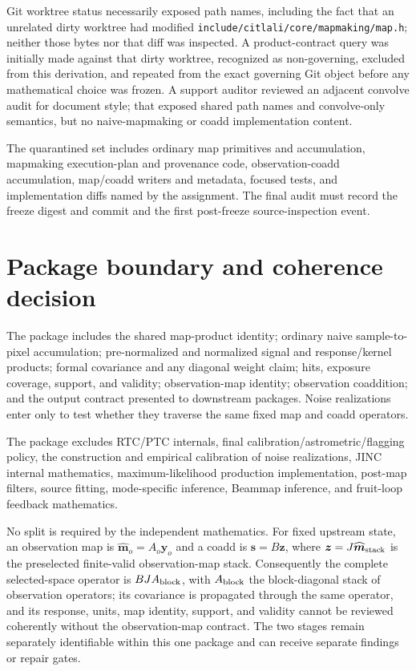 \documentclass[11pt]{article}
\newcommand{\code}[1]{\nolinkurl{#1}}
\begin{document}
Git worktree status necessarily exposed path names, including the fact that an
unrelated dirty worktree had modified
\code{include/citlali/core/mapmaking/map.h}; neither those bytes nor that diff
was inspected. A product-contract query was initially made against that dirty
worktree, recognized as non-governing, excluded from this derivation, and
repeated from the exact governing Git object before any mathematical choice was
frozen. A support auditor reviewed an adjacent convolve audit for document
style; that exposed shared path names and convolve-only semantics, but no
naive-mapmaking or coadd implementation content.

The quarantined set includes ordinary map primitives and accumulation,
mapmaking execution-plan and provenance code, observation-coadd accumulation,
map/coadd writers and metadata, focused tests, and implementation diffs named
by the assignment. The final audit must record the freeze digest and commit
and the first post-freeze source-inspection event.

\section{Package boundary and coherence decision}

The package includes the shared map-product identity; ordinary naive
sample-to-pixel accumulation; pre-normalized and normalized signal and
response/kernel products; formal covariance and any diagonal weight claim;
hits, exposure coverage, support, and validity; observation-map identity;
observation coaddition; and the output contract presented to downstream
packages. Noise realizations enter only to test whether they traverse the same
fixed map and coadd operators.

The package excludes RTC/PTC internals, final calibration/astrometric/flagging
policy, the construction and empirical calibration of noise realizations,
JINC internal mathematics, maximum-likelihood production implementation,
post-map filters, source fitting, mode-specific inference, Beammap inference,
and fruit-loop feedback mathematics.

No split is required by the independent mathematics. For fixed upstream state,
an observation map is \(\widehat{\boldsymbol m}_o=A_o\boldsymbol y_o\) and a
coadd is \(\widehat{\boldsymbol s}=B\boldsymbol z\), where
\(\boldsymbol z=J\widehat{\boldsymbol m}_{\rm stack}\) is the preselected
finite-valid observation-map stack. Consequently the complete selected-space
operator is \(BJA_{\rm block}\), with \(A_{\rm block}\) the block-diagonal
stack of observation operators; its covariance is propagated through the same
operator, and its response, units, map identity, support, and validity cannot
be reviewed coherently without the observation-map contract. The two stages
remain separately identifiable within this one package and can receive
separate findings or repair gates.
\end{document}

